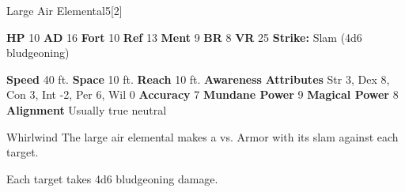       
  \begin{monsubsection}{Large Air Elemental}{5}[2]
    \vspace{-1em}\vspace{-1em}
    \vspace{0em}

    
    

    \begin{spellcontent}
      \begin{spelltargetinginfo}
        \pari \textbf{HP} 10 \monsep
          \textbf{AD} 16 \monsep
          \textbf{Fort} 10 \monsep
          \textbf{Ref} 13 \monsep
          \textbf{Ment} 9
        \pari \textbf{BR} 8 \monsep
        \textbf{VR} 25
        \pari \textbf{Strike:}
            Slam  (4d6 bludgeoning)
      \end{spelltargetinginfo}
    \end{spellcontent}
    \begin{monsterfooter}
      \pari \textbf{Speed} 40 ft. \monsep
        \textbf{Space} 10 ft. \monsep
        \textbf{Reach} 10 ft.
      \pari \textbf{Awareness} 
      \pari \textbf{Attributes}
        Str 3, Dex 8,
        Con 3, Int -2,
        Per 6, Wil 0
      \pari \textbf{Accuracy} 7 \monsep
        \textbf{Mundane Power} 9 \monsep
      \textbf{Magical Power} 8
      \pari \textbf{Alignment} Usually true neutral
    \end{monsterfooter}
  \end{monsubsection}
  \begin{freeability}{Whirlwind}
       The large air elemental makes a 
         vs. Armor
        with its slam against each target.
    
    \hit Each target takes 4d6 bludgeoning damage.
    \end{freeability}
  

